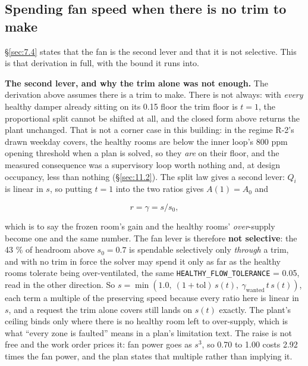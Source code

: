 \subsection{Spending fan speed when there is no trim to make}\label{sec:E.2}

\S\ref{sec:7.4} states that the fan is the second lever and that it is not selective. This is that
derivation in full, with the bound it runs into.

\textbf{The second lever, and why the trim alone was not enough.} The derivation above assumes
there is a trim to make. There is not always: with \emph{every} healthy damper already sitting on
its 0.15 floor the trim floor is $t = 1$, the proportional split cannot be shifted at all, and the
closed form above returns the plant unchanged. That is not a corner case in this building: in the
regime R-2's drawn weekday covers, the healthy rooms are below the inner loop's 800 ppm opening
threshold when a plan is solved, so they \emph{are} on their floor, and the measured consequence was
a supervisory loop worth nothing and, at design occupancy, less than nothing (§\ref{sec:11.2}). The split law
gives a second lever: $Q_i$ is linear in $s$, so putting $t = 1$ into the two ratios gives
$A(1) = A_0$ and

\[ r = \gamma = s/s_0, \]

which is to say the frozen room's gain and the healthy rooms' \emph{over}-supply become one and the
same number. The fan lever is therefore \textbf{not selective}: the 43 \% of headroom above
$s_0 = 0.7$ is spendable selectively only \emph{through} a trim, and with no trim in force the
solver may spend it only as far as the healthy rooms tolerate being over-ventilated, the same
\texttt{HEALTHY\_FLOW\_TOLERANCE} = 0.05, read in the other direction. So
$s = \min(1.0,\ (1+\text{tol})\,s(t),\ \gamma_\text{wanted}\,t\,s(t))$, each term a multiple of
the preserving speed because every ratio here is linear in $s$, and a request the trim alone covers
still lands on $s(t)$ exactly. The plant's ceiling binds only where there is no healthy room left to
over-supply, which is what ``every zone is faulted'' means in a plan's limitation text. The raise is
not free and the work order prices it: fan power goes as $s^3$, so 0.70 to 1.00 costs 2.92 times the
fan power, and the plan states that multiple rather than implying it.
